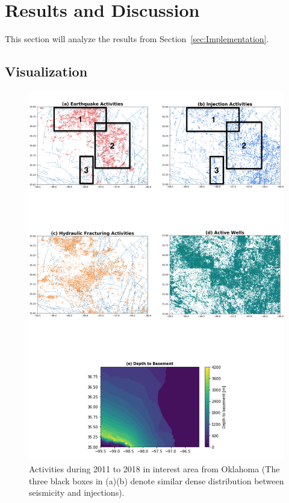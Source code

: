 \documentclass[final-report]{report-template}
\begin{document}
\section{Results and Discussion}
\label{sec:results}
This section will analyze the results from Section~\ref{sec:Implementation}.

\subsection{Visualization}
\label{sec:visualization_result}

\begin{figure}
    \begin{center}
        \includegraphics[width=1\textwidth]{activity.png}
    \end{center}
    \caption{\label{fig:activity} Activities during 2011 to 2018 in interest area from Oklahoma (The three black boxes in (a)(b) denote similar dense distribution between seismicity and injections).}
\end{figure}
\end{document}
